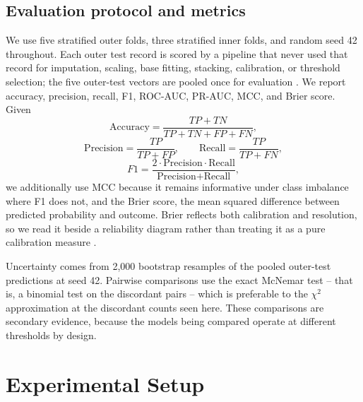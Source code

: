 \documentclass[conference]{IEEEtran}
\begin{document}
\subsection{Evaluation protocol and metrics}
We use five stratified outer folds, three stratified inner folds, and random seed 42 throughout. Each outer test record is scored by a pipeline that never used that record for imputation, scaling, base fitting, stacking, calibration, or threshold selection; the five outer-test vectors are pooled once for evaluation \cite{b30}. We report accuracy, precision, recall, F1, ROC-AUC, PR-AUC, MCC, and Brier score. Given
\begin{equation}
\text{Accuracy} = \frac{TP+TN}{TP+TN+FP+FN}, \label{eq:acc}
\end{equation}
\begin{equation}
\text{Precision} = \frac{TP}{TP+FP}, \qquad \text{Recall} = \frac{TP}{TP+FN}, \label{eq:pr}
\end{equation}
\begin{equation}
F1 = \frac{2\cdot\text{Precision}\cdot\text{Recall}}{\text{Precision}+\text{Recall}}, \label{eq:f1}
\end{equation}
we additionally use MCC because it remains informative under class imbalance where F1 does not, and the Brier score, the mean squared difference between predicted probability and outcome. Brier reflects both calibration and resolution, so we read it beside a reliability diagram rather than treating it as a pure calibration measure \cite{b32}.

Uncertainty comes from 2{,}000 bootstrap resamples of the pooled outer-test predictions at seed 42. Pairwise comparisons use the exact McNemar test -- that is, a binomial test on the discordant pairs -- which is preferable to the $\chi^2$ approximation at the discordant counts seen here. These comparisons are secondary evidence, because the models being compared operate at different thresholds by design.

\section{Experimental Setup}
\end{document}
